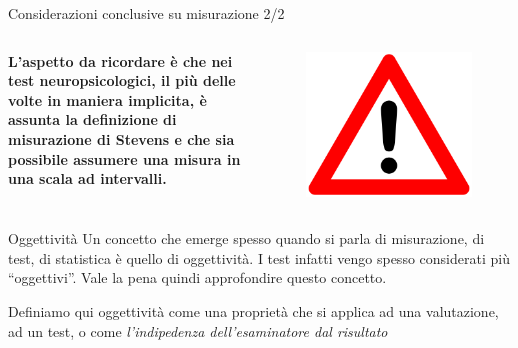 \documentclass[
  ignorenonframetext,
]{beamer}
\begin{document}
\begin{frame}{Considerazioni conclusive su misurazione 2/2}
\label{considerazioni-conclusive-su-misurazione-22}
\begin{columns}
\small
\textbf{L'aspetto da ricordare è che nei test neuropsicologici, il più delle volte in maniera implicita, è assunta la definizione di misurazione di Stevens e che sia possibile assumere una misura in una scala ad intervalli.} 

\begin{figure}
\includegraphics[scale=0.05]{Figures/triangle.png}
\end{figure}
\end{columns}
\end{frame}

\begin{frame}{Oggettività}
\label{oggettivituxe0}
Un concetto che emerge spesso quando si parla di misurazione, di test,
di statistica è quello di oggettività. \pause I test infatti vengo
spesso considerati più ``oggettivi''. Vale la pena quindi approfondire
questo concetto.

\pause
\vfill

Definiamo qui oggettività come una proprietà che si applica ad una
valutazione, ad un test, o come \emph{l'indipedenza dell'esaminatore dal
risultato}
\end{frame}
\end{document}
